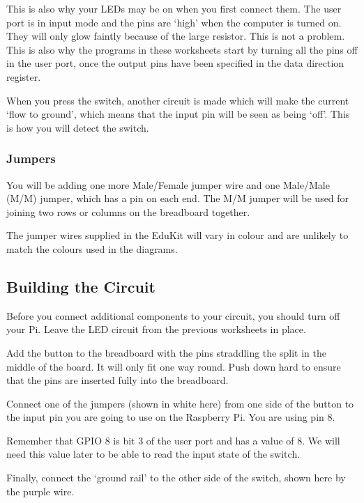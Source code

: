 This is also why your LEDs may be on when you first connect them.  The user port is in input mode and the pins are `high' when the computer is turned on.  They will only glow faintly because of the large resistor.  This is not a problem.  This is also why the programs in these worksheets start by turning all the pins off in the user port, once the output pins have been specified in the data direction register.

When you press the switch, another circuit is made which will make the current `flow to ground', which means that the input pin will be seen as being `off'.  This is how you will detect the switch.

\subsubsection*{Jumpers}


You will be adding one more Male/Female jumper wire and one Male/Male (M/M) jumper, which has a pin on each end.  The M/M jumper will be used for joining two rows or columns on the breadboard together.

The jumper wires supplied in the EduKit will vary in colour and are unlikely to match the colours used in the diagrams.

\subsection*{Building the Circuit}

Before you connect additional components to your circuit, you should turn off your Pi.  Leave the LED circuit from the previous worksheets in place.

Add the button to the breadboard with the pins straddling the split in the middle of the board.  It will only fit one way round.  Push down hard to ensure that the pins are inserted fully into the breadboard.


Connect one of the jumpers (shown in white here) from one side of the button to the input pin you are going to use on the Raspberry Pi.  You are using pin 8.

Remember that GPIO 8 is bit 3 of the user port and has a value of 8.  We will need this value later to be able to read the input state of the switch.

Finally, connect the `ground rail' to the other side of the switch, shown here by the purple wire.

